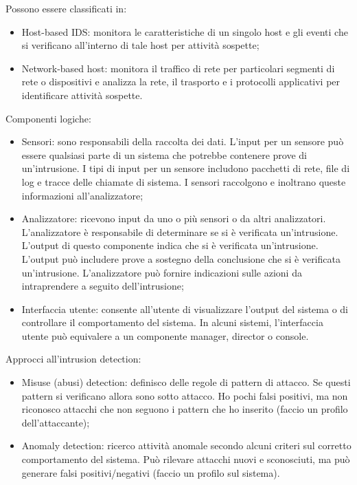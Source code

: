 Possono essere classificati in:
\begin{itemize}
    \item Host-based IDS: monitora le caratteristiche di un singolo host e gli eventi che si verificano all'interno di tale host per attività sospette;
	\item Network-based host: monitora il traffico di rete per particolari segmenti di rete o dispositivi e analizza la rete, il trasporto e i protocolli applicativi per identificare attività sospette.
\end{itemize}

Componenti logiche:
\begin{itemize}
    \item Sensori: sono responsabili della raccolta dei dati. L'input per un sensore può essere qualsiasi parte di un sistema che potrebbe contenere prove di un'intrusione. I tipi di input per un sensore includono pacchetti di rete, file di log e tracce delle chiamate di sistema. I sensori raccolgono e inoltrano queste informazioni all'analizzatore;
	\item Analizzatore: ricevono input da uno o più sensori o da altri analizzatori. L'analizzatore è responsabile di determinare se si è verificata un'intrusione. L'output di questo componente indica che si è verificata un'intrusione. L'output può includere prove a sostegno della conclusione che si è verificata un'intrusione. L'analizzatore può fornire indicazioni sulle azioni da intraprendere a seguito dell'intrusione;
	\item Interfaccia utente: consente all'utente di visualizzare l'output del sistema o di controllare il comportamento del sistema. In alcuni sistemi, l'interfaccia utente può equivalere a un componente manager, director o console.
\end{itemize}

Approcci all'intrusion detection:
\begin{itemize}
    \item Misuse (abusi) detection: definisco delle regole di pattern di attacco. Se questi pattern si verificano allora sono sotto attacco. Ho pochi falsi positivi, ma non riconosco attacchi che non seguono i pattern che ho inserito (faccio un profilo dell'attaccante);
	\item Anomaly detection: ricerco attività anomale secondo alcuni criteri sul corretto comportamento del sistema. Può rilevare attacchi nuovi e sconosciuti, ma può generare falsi positivi/negativi (faccio un profilo sul sistema).
\end{itemize}

